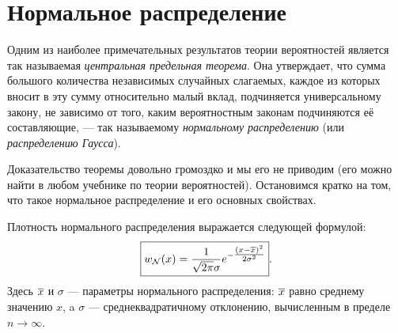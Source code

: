 

\section{Нормальное распределение}\label{sec:normal}

Одним из наиболее примечательных результатов теории вероятностей является
так называемая \emph{центральная предельная теорема}. Она утверждает,
что сумма большого количества независимых случайных слагаемых, каждое
из которых вносит в эту сумму относительно малый вклад, подчиняется
универсальному закону, не зависимо от того, каким вероятностным законам
подчиняются её составляющие, --- так называемому \emph{нормальному
распределению} (или \emph{распределению Гаусса}).

Доказательство теоремы довольно громоздко и мы его не приводим (его можно найти
в любом учебнике по теории вероятностей). Остановимся
кратко на том, что такое нормальное распределение и его основных свойствах.

Плотность нормального распределения выражается следующей формулой:
\begin{equation}
    \label{eq:normal}
    \boxed{
w_{\mathcal{N}}\!\left(x\right)=\frac{1}{\sqrt{2\pi}\sigma}e^{-\tfrac{(x-\overline{x})^
{2}}{2\sigma^{2}}}
    }.
\end{equation}
Здесь $\overline{x}$ и $\sigma$
--- параметры нормального распределения: $\overline{x}$ равно
среднему значению $x$, a $\sigma$ ---
среднеквадратичному отклонению, вычисленным в пределе $n\to\infty$.

